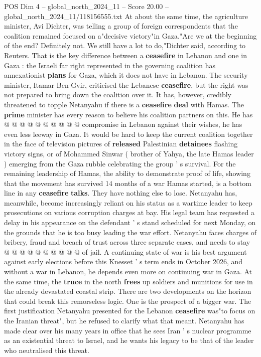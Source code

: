 \begin{textsample}{POS Dim 4 – global\_north\_2024\_11 – Score 20.00 – global\_north\_2024\_11/118156555.txt}
At about the same time, the agriculture minister, Avi Dichter, was telling a group of foreign correspondents that the coalition remained focused on a"decisive victory"in Gaza."Are we at the beginning of the end?
Definitely not.
We still have a lot to do,"Dichter said, according to Reuters.
That is the key difference between a \textbf{ceasefire} in Lebanon and one in Gaza : the Israeli far right represented in the governing coalition has annexationist \textbf{plans} for Gaza, which it does not have in Lebanon.
The security minister, Itamar Ben-Gvir, criticised the Lebanese \textbf{ceasefire}, but the right was not prepared to bring down the coalition over it.
It has, however, credibly threatened to topple Netanyahu if there is a \textbf{ceasefire} \textbf{deal} with Hamas.
The \textbf{prime} minister has every reason to believe his coalition partners on this.
He has @ @ @ @ @ @ @ @ @ @ compromise in Lebanon against their wishes, he has even less leeway in Gaza.
It would be hard to keep the current coalition together in the face of television pictures of \textbf{released} Palestinian \textbf{detainees} flashing victory signs, or of Mohammed Sinwar ( brother of Yahya, the late Hamas leader ) emerging from the Gaza rubble celebrating the group ' s survival.
For the remaining leadership of Hamas, the ability to demonstrate proof of life, showing that the movement has survived 14 months of a war Hamas started, is a bottom line in any \textbf{ceasefire} \textbf{talks}.
They have nothing else to lose.
Netanyahu has, meanwhile, become increasingly reliant on his status as a wartime leader to keep prosecutions on various corruption charges at bay.
His legal team has requested a delay in his appearance on the defendant ' s stand scheduled for next Monday, on the grounds that he is too busy leading the war effort.
Netanyahu faces charges of bribery, fraud and breach of trust across three separate cases, and needs to stay @ @ @ @ @ @ @ @ @ @ of jail.
A continuing state of war is his best argument against early elections before this Knesset ' s term ends in October 2026, and without a war in Lebanon, he depends even more on continuing war in Gaza.
At the same time, the \textbf{truce} in the north \textbf{frees} up soldiers and munitions for use in the already devastated coastal strip.
There are two developments on the horizon that could break this remorseless logic.
One is the prospect of a bigger war.
The first justification Netanyahu presented for the Lebanon \textbf{ceasefire} was"to focus on the Iranian threat", but he refused to clarify what that meant.
Netanyahu has made clear over his many years in office that he sees Iran ' s nuclear programme as an existential threat to Israel, and he wants his legacy to be that of the leader who neutralised this threat.

\end{textsample}
